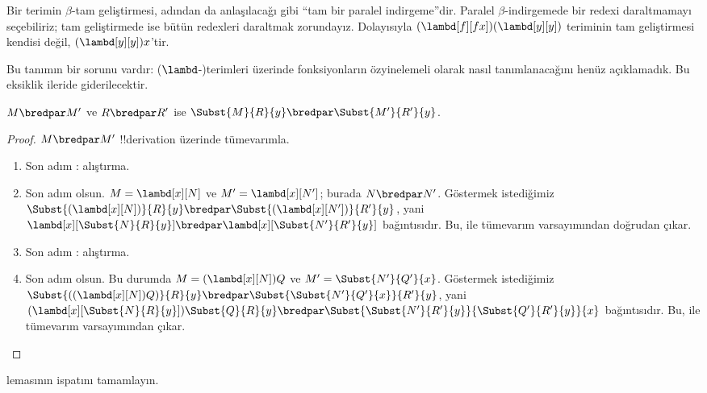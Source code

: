 \documentclass[../../../include/open-logic-section]{subfiles}
\begin{document}
Bir terimin $\beta$-tam geliştirmesi, adından da anlaşılacağı gibi ``tam bir
paralel indirgeme''dir. Paralel $\beta$-indirgemede bir redexi daraltmamayı
seçebiliriz; tam geliştirmede ise bütün redexleri daraltmak zorundayız.
Dolayısıyla $(\lambd[f][fx])(\lambd[y][y])$ teriminin tam geliştirmesi
kendisi değil, $(\lambd[y][y])x$'tir.

\begin{editorial}
  Bu tanımın bir sorunu vardır: ($\lambd$-)terimleri üzerinde fonksiyonların
  özyinelemeli olarak nasıl tanımlanacağını henüz açıklamadık. Bu eksiklik
  ileride giderilecektir.
\end{editorial}

\begin{lem}
  $M \bredpar M'$ ve $R \bredpar R'$ ise $\Subst{M}{R}{y}
  \bredpar \Subst{M'}{R'}{y}$.
\end{lem}

\begin{proof}
  $M \bredpar M'$ !!{derivation} üzerinde tümevarımla.
  \begin{enumerate}
    \item Son adım : alıştırma.
    \item Son adım  olsun. $M=\lambd[x][N]$ ve
      $M'=\lambd[x][N']$; burada $N\bredpar N'$. Göstermek istediğimiz
      $\Subst{(\lambd[x][N])}{R}{y}\bredpar
      \Subst{(\lambd[x][N'])}{R'}{y}$, yani
      $\lambd[x][\Subst{N}{R}{y}]\bredpar
      \lambd[x][\Subst{N'}{R'}{y}]$ bağıntısıdır. Bu,
       ile tümevarım varsayımından doğrudan çıkar.
    \item Son adım : alıştırma.
    \item Son adım  olsun. Bu durumda
      $M=(\lambd[x][N])Q$ ve $M'=\Subst{N'}{Q'}{x}$. Göstermek istediğimiz
      $\Subst{((\lambd[x][N])Q)}{R}{y}\bredpar
      \Subst{\Subst{N'}{Q'}{x}}{R'}{y}$, yani
      $(\lambd[x][\Subst{N}{R}{y}])\Subst{Q}{R}{y}\bredpar
      \Subst{\Subst{N'}{R'}{y}}{\Subst{Q'}{R'}{y}}{x}$ bağıntısıdır. Bu,
       ile tümevarım varsayımından çıkar.
  \end{enumerate}
\end{proof}

\begin{prob}
   lemasının ispatını tamamlayın.
\end{prob}
\end{document}
